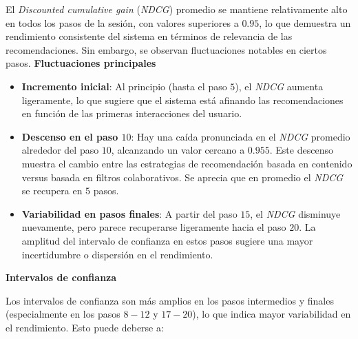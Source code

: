 \documentclass[11pt,a4paper,twoside]{thesis}
\begin{document}
El \textit{Discounted cumulative gain} (\textit{NDCG}) promedio se mantiene relativamente alto en todos los pasos de la sesión, con valores superiores a $0.95$, lo que demuestra un rendimiento consistente del sistema en términos de relevancia de las recomendaciones. Sin embargo, se observan fluctuaciones notables en ciertos pasos.
\newline
\newline
\newline
\textbf{Fluctuaciones principales}

\begin{itemize}
	\item \textbf{Incremento inicial}: Al principio (hasta el paso $5$), el \textit{NDCG} aumenta ligeramente, lo que sugiere que el sistema está afinando las recomendaciones en función de las primeras interacciones del usuario.
	\item \textbf{Descenso en el paso $10$}: Hay una caída pronunciada en el \textit{NDCG} promedio alrededor del paso $10$, alcanzando un valor cercano a $0.955$. Este descenso muestra el cambio entre las estrategias de recomendación basada en contenido versus basada en filtros colaborativos. Se aprecia que en promedio el \textit{NDCG} se recupera en $5$ pasos.
	\item \textbf{Variabilidad en pasos finales}: A partir del paso $15$, el \textit{NDCG} disminuye nuevamente, pero parece recuperarse ligeramente hacia el paso $20$. La amplitud del intervalo de confianza en estos pasos sugiere una mayor incertidumbre o dispersión en el rendimiento.

\end{itemize}


\textbf{Intervalos de confianza}

Los intervalos de confianza son más amplios en los pasos intermedios y finales (especialmente en los pasos $8-12$ y $17-20$), lo que indica mayor variabilidad en el rendimiento. Esto puede deberse a:
\end{document}
